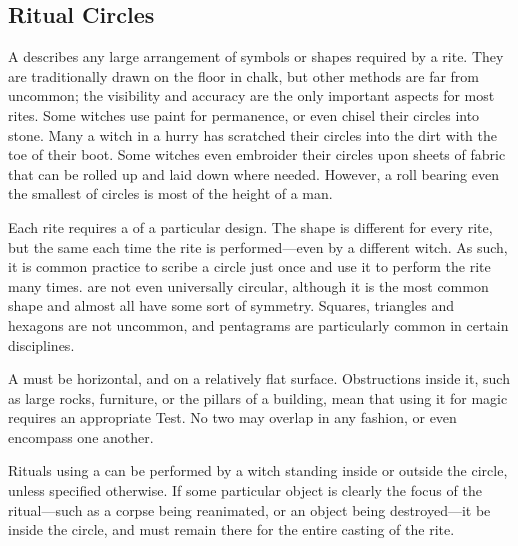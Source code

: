 \subsection{Ritual Circles}

A  describes any large arrangement of symbols or shapes required by a rite.
They are traditionally drawn on the floor in chalk, but other methods are far from uncommon; the visibility and accuracy are the only important aspects for most rites.
Some witches use paint for permanence, or even chisel their circles into stone.
Many a witch in a hurry has scratched their circles into the dirt with the toe of their boot.
Some witches even embroider their circles upon sheets of fabric that can be rolled up and laid down where needed.
However, a roll bearing even the smallest of circles is most of the height of a man.

Each rite requires a  of a particular design.
The shape is different for every rite, but the same each time the rite is performed---even by a different witch.
As such, it is common practice to scribe a circle just once and use it to perform the rite many times.
 are not even universally circular, although it is the most common shape and almost all have some sort of symmetry.
Squares, triangles and hexagons are not uncommon, and pentagrams are particularly common in certain disciplines.

A  must be horizontal, and on a relatively flat surface.
Obstructions inside it, such as large rocks, furniture, or the pillars of a building, mean that using it for magic requires an appropriate Test.
No two  may overlap in any fashion, or even encompass one another.

Rituals using a  can be performed by a witch standing inside or outside the circle, unless specified otherwise.
If some particular object is clearly the focus of the ritual---such as a corpse being reanimated, or an object being destroyed---it be inside the circle, and must remain there for the entire casting of the rite.

